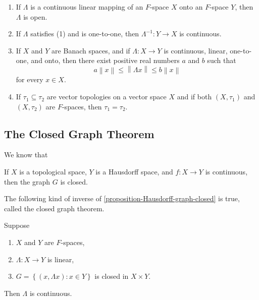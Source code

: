 \begin{corollary}
  \label{corollary-the-open-mapping-theorem}
  \begin{enumerate}
    \item If \( \Lambda \) is a continuous linear mapping of an \( F \)-space \( X \) onto an \( F \)-space \( Y \), then \( \Lambda \) is open.
    \item If \( \Lambda \) satisfies (1) and is one-to-one, then \( \Lambda ^{-1}: Y \to X \) is continuous.
    \item If \( X \) and \( Y \) are Banach spaces, and if \( \Lambda: X \to Y \) is continuous, linear, one-to-one, and onto, then there exist positive real numbers \( a \) and \( b \) such that
          \[
            a \left\lVert x \right\rVert \leq \left\lVert \Lambda x \right\rVert \leq b \left\lVert x \right\rVert
          \]
          for every \( x \in X \).
    \item If \( \tau_1 \subseteq \tau_2 \) are vector topologies on a vector space \( X \) and if both \( (X, \tau_1) \) and \( (X, \tau_2) \) are \( F \)-spaces, then \( \tau_1 = \tau_2 \).
  \end{enumerate}
\end{corollary}

\subsection{The Closed Graph Theorem}
\label{subsection-the-closed-graph-theorem}
We know that
\begin{proposition}
  \label{proposition-Hausdorff-graph-closed}
  If \( X \) is a topological space, \( Y \) is a Hausdorff space, and \( f: X \to Y \) is continuous, then the graph \( G \) is closed.
\end{proposition}

The following kind of inverse of \ref{proposition-Hausdorff-graph-closed} is true, called the closed graph theorem.

\begin{theorem}
  \label{theorem-the-closed-graph-theorem}
  Suppose
  \begin{enumerate}
    \item \( X \) and \( Y \) are \( F \)-spaces,
    \item \( \Lambda: X \to Y \) is linear,
    \item \( G = \left\lbrace (x, \Lambda x): x \in Y \right\rbrace \) is closed in \( X \times Y \).
  \end{enumerate}
  Then \( \Lambda \) is continuous.
\end{theorem}

